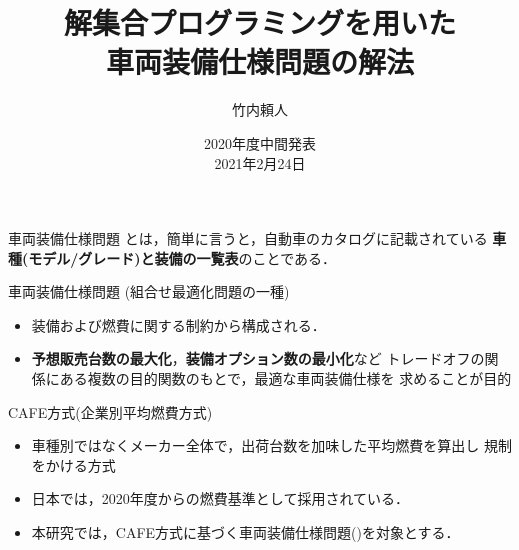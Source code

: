\documentclass[dvipdfmx, 11pt]{beamer}
\title{解集合プログラミングを用いた\\車両装備仕様問題の解法}
\author{竹内頼人}
\institute{名古屋大学 大学院情報学研究科 番原研究室}
\date{2020年度中間発表\\ 2021年2月24日}
\begin{document}
\frame{\titlepage}
\begin{frame}{車両装備仕様問題}
 とは，簡単に言うと，自動車のカタログに記載されている
 \textbf{車種(モデル/グレード)と装備の一覧表}のことである．
 \begin{block}{車両装備仕様問題 (組合せ最適化問題の一種)}
  \begin{itemize}
   \item 装備および燃費に関する制約から構成される．
   \item {\bf 予想販売台数の最大化}，{\bf 装備オプション数の最小化}など
	 トレードオフの関係にある複数の目的関数のもとで，最適な車両装備仕様を
	 求めることが目的
  \end{itemize}
 \end{block}
 \begin{alertblock}{CAFE方式(企業別平均燃費方式)}
  \begin{itemize}
   \item 車種別ではなくメーカー全体で，出荷台数を加味した平均燃費を算出し
	 規制をかける方式
   \item 日本では，2020年度からの燃費基準として採用されている．
  \end{itemize}
 \end{alertblock}
 \begin{itemize}
  \item 本研究では，CAFE方式に基づく車両装備仕様問題()を対象とする．
 \end{itemize}
\end{frame}
\end{document}
